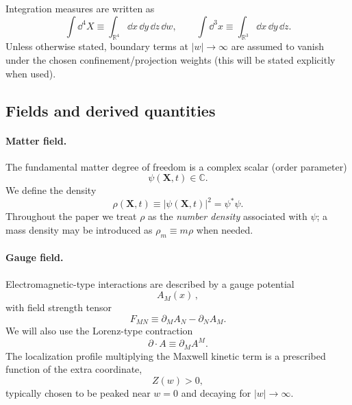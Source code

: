 \documentclass[11pt]{article}
\begin{document}
Integration measures are written as
\begin{equation}
\int \dd^4X \equiv \int_{\mathbb{R}^4} \dd x\,\dd y\,\dd z\,\dd w,
\qquad
\int \dd^3x \equiv \int_{\mathbb{R}^3} \dd x\,\dd y\,\dd z.
\end{equation}
Unless otherwise stated, boundary terms at $|w|\to\infty$ are assumed to vanish under the chosen confinement/projection weights (this will be stated explicitly when used).

\subsection{Fields and derived quantities}
\label{sec:fields}

\paragraph{Matter field.}
The fundamental matter degree of freedom is a complex scalar (order parameter)
\begin{equation}
\psi(\mathbf{X},t)\in\mathbb{C}.
\end{equation}
We define the density
\begin{equation}
\rho(\mathbf{X},t) \equiv |\psi(\mathbf{X},t)|^2 = \psi^*\psi.
\end{equation}
Throughout the paper we treat $\rho$ as the \emph{number density} associated with $\psi$; a mass density may be introduced as $\rho_m \equiv m\rho$ when needed.

\paragraph{Gauge field.}
Electromagnetic-type interactions are described by a gauge potential
\begin{equation}
A_M(x)\,,
\end{equation}
with field strength tensor
\begin{equation}
F_{MN}\equiv \partial_M A_N-\partial_N A_M.
\end{equation}
We will also use the Lorenz-type contraction
\begin{equation}
\partial\!\cdot\!A \equiv \partial_M A^M.
\end{equation}
The localization profile multiplying the Maxwell kinetic term is a prescribed function of the extra coordinate,
\begin{equation}
Z(w)>0,
\end{equation}
typically chosen to be peaked near $w=0$ and decaying for $|w|\to\infty$.
\end{document}
